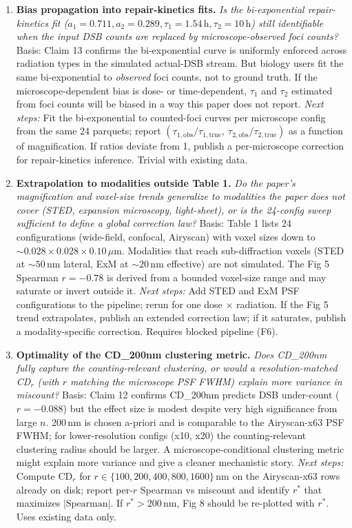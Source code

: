 \begin{enumerate}
\item \textbf{Bias propagation into repair-kinetics fits.}
\emph{Is the bi-exponential repair-kinetics fit ($a_1{=}0.711, a_2{=}0.289,
\tau_1{=}1.54\,\text{h}, \tau_2{=}10\,\text{h}$) still identifiable when the input
DSB counts are replaced by microscope-observed foci counts?} Basis: Claim 13
confirms the bi-exponential curve is uniformly enforced across radiation types
in the simulated actual-DSB stream. But biology users fit the same
bi-exponential to \emph{observed} foci counts, not to ground truth. If the
microscope-dependent bias is dose- or time-dependent, $\tau_1$ and $\tau_2$
estimated from foci counts will be biased in a way this paper does not report.
\emph{Next steps:} Fit the bi-exponential to counted-foci curves per microscope
config from the same 24 parquets; report
$(\tau_{1,\text{obs}}/\tau_{1,\text{true}},\ \tau_{2,\text{obs}}/\tau_{2,\text{true}})$
as a function of magnification. If ratios deviate from 1, publish a per-microscope
correction for repair-kinetics inference. Trivial with existing data.

\item \textbf{Extrapolation to modalities outside Table 1.}
\emph{Do the paper's magnification and voxel-size trends generalize to
modalities the paper does not cover (STED, expansion microscopy, light-sheet),
or is the 24-config sweep sufficient to define a global correction law?} Basis:
Table 1 lists 24 configurations (wide-field, confocal, Airyscan) with voxel
sizes down to $\sim0.028{\times}0.028{\times}0.10\,\mu\text{m}$. Modalities that
reach sub-diffraction voxels (STED at $\sim50\,\text{nm}$ lateral, ExM at
$\sim20\,\text{nm}$ effective) are not simulated. The Fig 5
Spearman $r=-0.78$ is derived from a bounded voxel-size range and may saturate or
invert outside it. \emph{Next steps:} Add STED and ExM PSF configurations to the
pipeline; rerun for one dose $\times$ radiation. If the Fig 5 trend extrapolates,
publish an extended correction law; if it saturates, publish a modality-specific
correction. Requires blocked pipeline (F6).

\item \textbf{Optimality of the CD\_200nm clustering metric.}
\emph{Does CD\_200nm fully capture the counting-relevant clustering, or would a
resolution-matched CD$_r$ (with $r$ matching the microscope PSF FWHM) explain
more variance in miscount?} Basis: Claim 12 confirms CD\_200nm predicts DSB
under-count ($r=-0.088$) but the effect size is modest despite very high
significance from large $n$. 200\,nm is chosen a-priori and is comparable to the
Airyscan-x63 PSF FWHM; for lower-resolution configs (x10, x20) the
counting-relevant clustering radius should be larger. A microscope-conditional
clustering metric might explain more variance and give a cleaner mechanistic
story. \emph{Next steps:} Compute CD$_r$ for $r \in \{100, 200, 400, 800, 1600\}$\,nm
on the Airyscan-x63 rows already on disk; report per-$r$ Spearman vs miscount
and identify $r^*$ that maximizes $|\text{Spearman}|$. If $r^*>200\,$nm, Fig 8
should be re-plotted with $r^*$. Uses existing data only.

\end{enumerate}
